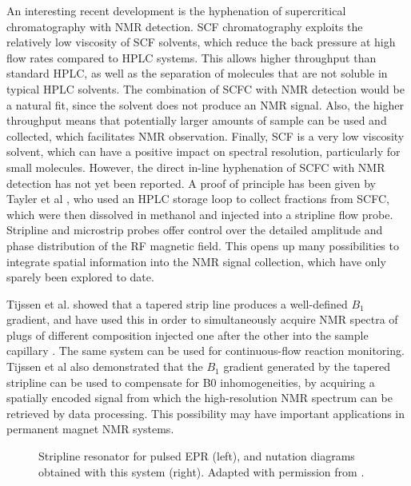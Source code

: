 An interesting recent
development is the hyphenation of supercritical  chromatography
with NMR detection. SCF chromatography exploits the relatively low
viscosity of SCF solvents, which reduce the back pressure at high flow
rates compared to HPLC systems. This allows higher throughput than
standard HPLC, as well as the separation of molecules that are not
soluble in typical HPLC solvents. The combination of SCFC with NMR
detection would be a natural fit, since the solvent does not produce an
NMR signal. Also, the higher throughput means that potentially larger
amounts of sample can be used and collected, which facilitates NMR
observation. Finally, SCF  is a very low viscosity solvent, which
can have a positive impact on spectral resolution, particularly for
small molecules. However, the direct in-line hyphenation of SCFC with
NMR detection has not yet been reported. A proof of principle has been
given by Tayler et al \cite{Tayler:2015gn}, who used an HPLC storage loop
to collect fractions from SCFC, which were then dissolved in methanol
and injected into a stripline flow probe. Stripline and microstrip
probes offer control over the detailed amplitude and phase distribution
of the RF magnetic field. This opens up many possibilities to integrate
spatial information into the NMR signal collection, which have only
sparely been explored to date. 

Tijssen et al. showed that a tapered
strip line produces a well-defined $B_1$ gradient, and have used this in
order to simultaneously acquire NMR spectra of plugs of different
composition injected one after the other into the sample capillary
\cite{Tijssen:2016hu}. The same system can be used for continuous-flow
reaction monitoring. Tijssen et al also demonstrated that the $B_1$
gradient generated by the tapered stripline can be used to compensate
for B0 inhomogeneities, by acquiring a spatially encoded signal from
which the high-resolution NMR spectrum can be retrieved by data
processing. This possibility may have important applications in
permanent magnet NMR systems. 


\begin{figure}
	\begin{center}
	\end{center}
	\caption{Stripline resonator for pulsed EPR (left), and nutation diagrams obtained
	with this system (right). Adapted with permission from \cite{Yap:2013ew}.}
	\label{fig-Yap-2013ew}
\end{figure}


